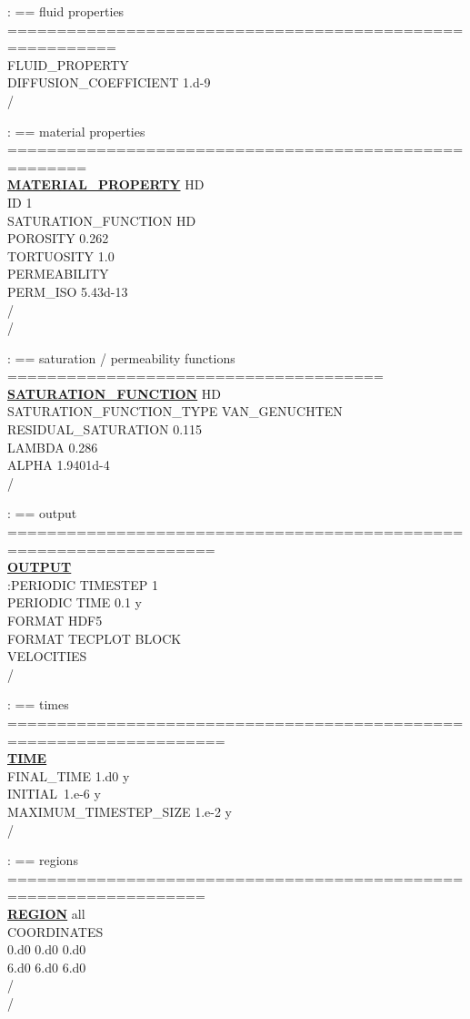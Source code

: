 \documentclass[12pt]{article}
\begin{document}
\noindent
: == fluid properties =========================================================\\
FLUID\_PROPERTY\\
DIFFUSION\_COEFFICIENT 1.d-9\\
/

\noindent
: == material properties ======================================================\\
\hyperlink{target_mat}{\bf MATERIAL\_PROPERTY} HD\\
ID 1\\
SATURATION\_FUNCTION HD\\
POROSITY 0.262\\
TORTUOSITY 1.0\\
PERMEABILITY\\
PERM\_ISO 5.43d-13\\
/\\
/

\noindent
: == saturation / permeability functions ======================================\\
\hyperlink{target_sat}{\bf SATURATION\_FUNCTION} HD\\
SATURATION\_FUNCTION\_TYPE VAN\_GENUCHTEN\\
RESIDUAL\_SATURATION 0.115\\
LAMBDA 0.286\\
ALPHA 1.9401d-4\\
/

\noindent
: == output ===================================================================\\
\hyperlink{target_output}{\bf OUTPUT}\\
:PERIODIC TIMESTEP 1\\
PERIODIC TIME 0.1 y\\
FORMAT HDF5\\
FORMAT TECPLOT BLOCK\\
VELOCITIES\\
/

\noindent
: == times ====================================================================\\
\hyperlink{target_time}{\bf TIME}\\
FINAL\_TIME 1.d0 y\\
INITIAL\ 1.e-6 y\\
MAXIMUM\_TIMESTEP\_SIZE 1.e-2 y\\
/

\noindent
: == regions ==================================================================\\
\hyperlink{target_region}{\bf REGION} all\\
COORDINATES\\
0.d0 0.d0 0.d0\\
6.d0 6.d0 6.d0\\
/\\
/
\end{document}
